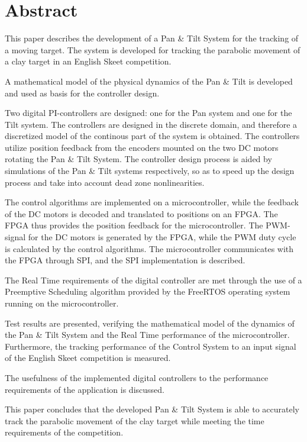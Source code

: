 
\setcounter{page}{1}
\section*{Abstract}
This paper describes the development of a Pan \& Tilt System for the tracking of a moving
target. The system is developed for tracking the parabolic movement of
a clay target in an English Skeet competition.

A mathematical model of the physical dynamics of the Pan \& Tilt is
developed and used as basis for the controller design.

Two digital PI-controllers are designed: one for the Pan system and one for the Tilt system.
The controllers are designed in the discrete domain, and therefore a discretized model
of the continous part of the system is obtained.
The controllers utilize position feedback from the encoders mounted on the two DC motors
rotating the Pan \& Tilt System.
The controller design process is aided by simulations of the Pan \& Tilt systems respectively,
so as to speed up the design process and take into account dead zone nonlinearities.

The control algorithms are implemented on a microcontroller, while
the feedback of the DC motors is decoded and translated to positions on an FPGA.
The FPGA thus provides the position feedback for the microcontroller.
The PWM-signal for the DC motors is generated by the FPGA, while the PWM duty cycle is calculated by the control algorithms.
The microcontroller communicates with the FPGA through SPI, and the SPI implementation is described.

The Real Time requirements of the digital controller are met through the use
of a Preemptive Scheduling algorithm provided by the FreeRTOS operating
system running on the microcontroller.

Test results are presented,
verifying the mathematical model of the dynamics of the Pan \& Tilt System
and the Real Time performance of the microcontroller.
Furthermore, the tracking performance of the Control System to an input signal
of the English Skeet competition is measured.

The usefulness of the implemented digital controllers to the performance requirements
of the application is discussed.

This paper concludes that the developed Pan \& Tilt System
is able to accurately track the parabolic movement of the clay target while
meeting the time requirements of the competition.

